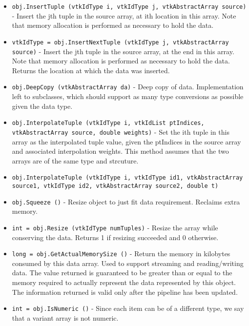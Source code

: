 \begin{itemize}
\item  \verb|obj.InsertTuple (vtkIdType i, vtkIdType j, vtkAbstractArray source)| -  Insert the jth tuple in the source array, at ith location in this array. 
 Note that memory allocation is performed as necessary to hold the data.

\item  \verb|vtkIdType = obj.InsertNextTuple (vtkIdType j, vtkAbstractArray source)| -  Insert the jth tuple in the source array, at the end in this array. 
 Note that memory allocation is performed as necessary to hold the data.
 Returns the location at which the data was inserted.

\item  \verb|obj.DeepCopy (vtkAbstractArray da)| -  Deep copy of data. Implementation left to subclasses, which
 should support as many type conversions as possible given the
 data type.

\item  \verb|obj.InterpolateTuple (vtkIdType i, vtkIdList ptIndices, vtkAbstractArray source, double weights)| -  Set the ith tuple in this array as the interpolated tuple value,
 given the ptIndices in the source array and associated 
 interpolation weights.
 This method assumes that the two arrays are of the same type
 and strcuture.

\item  \verb|obj.InterpolateTuple (vtkIdType i, vtkIdType id1, vtkAbstractArray source1, vtkIdType id2, vtkAbstractArray source2, double t)|

\item  \verb|obj.Squeeze ()| -  Resize object to just fit data requirement. Reclaims extra memory.

\item  \verb|int = obj.Resize (vtkIdType numTuples)| -  Resize the array while conserving the data.  Returns 1 if
 resizing succeeded and 0 otherwise.

\item  \verb|long = obj.GetActualMemorySize ()| -  Return the memory in kilobytes consumed by this data array. Used to
 support streaming and reading/writing data. The value returned is
 guaranteed to be greater than or equal to the memory required to
 actually represent the data represented by this object. The 
 information returned is valid only after the pipeline has 
 been updated.

\item  \verb|int = obj.IsNumeric ()| -  Since each item can be of a different type, we say that a variant array is not numeric.


\end{itemize}
